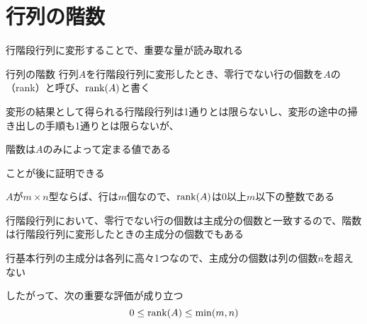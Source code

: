 \documentclass[../../../topic_linear-algebra]{subfiles}
\begin{document}
\sectionline
\section{行列の階数}

行階段行列に変形することで、重要な量が読み取れる

\begin{definition}{行列の階数}
  行列$A$を行階段行列に変形したとき、零行でない行の個数を$A$の（rank）と呼び、$\rank(A)$と書く
\end{definition}

変形の結果として得られる行階段行列は1通りとは限らないし、変形の途中の掃き出しの手順も1通りとは限らないが、
\begin{shaded}
  階数は$A$のみによって定まる値である
\end{shaded}
ことが後に証明できる

\sectionline

$A$が$m \times n$型ならば、行は$m$個なので、$\rank(A)$は0以上$m$以下の整数である

\br

行階段行列において、零行でない行の個数は主成分の個数と一致するので、階数は行階段行列に変形したときの主成分の個数でもある

\br

行基本行列の主成分は各列に高々1つなので、主成分の個数は列の個数$n$を超えない

\br

したがって、次の重要な評価が成り立つ
\begin{equation*}
  0 \leq \rank(A) \leq \min(m,n)
\end{equation*}
\end{document}
